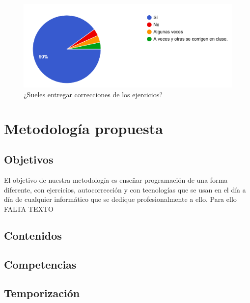 \begin{figure}[h!]
\centering
\includegraphics[width=1.0\textwidth]{../images/quiz_4}
\caption{¿Sueles entregar correcciones de los ejercicios?}
\label{fig:quiz_4}
\end{figure}


\section{Metodología propuesta}


\subsection{Objetivos}

El objetivo de nuestra metodología es enseñar programación de una forma diferente, con ejercicios, autocorrección y con tecnologías que se usan en el día a día de cualquier informático que se dedique profesionalmente a ello. Para ello FALTA TEXTO

\subsection{Contenidos}

\subsection{Competencias}

\subsection{Temporización}





